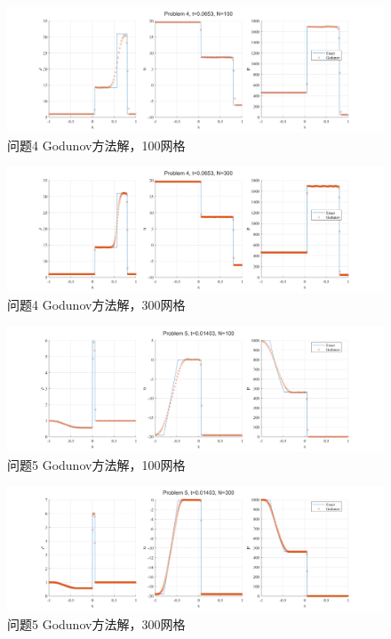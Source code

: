 \documentclass[UTF8,zihao=5]{ctexart} %
\begin{document}
\begin{figure}[H]
    \centering
    \includegraphics[width=18cm]{p4_gn_N100.png}  %
    \caption{问题4 Godunov方法解，100网格}
    \label{fig:4c}
\end{figure}

\begin{figure}[H]
    \centering
    \includegraphics[width=18cm]{p4_gn_N300.png}  %
    \caption{问题4 Godunov方法解，300网格}
    \label{fig:4c}
\end{figure}


\begin{figure}[H]
    \centering
    \includegraphics[width=18cm]{p5_gn_N100.png}  %
    \caption{问题5 Godunov方法解，100网格}
    \label{fig:5c}
\end{figure}

\begin{figure}[H]
    \centering
    \includegraphics[width=18cm]{p5_gn_N300.png}  %
    \caption{问题5 Godunov方法解，300网格}
    \label{fig:5c}
\end{figure}
\end{document}
